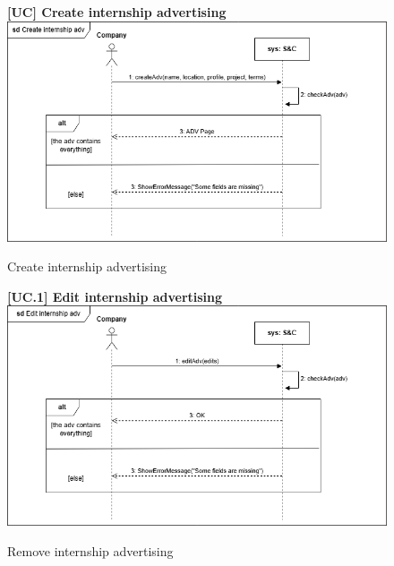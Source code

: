 \begin{figure}[H]
\textbf{[UC\nextUCDiagr] Create internship advertising}\newline\newline
\includegraphics[width=15cm]{Images/UC_diagram/RASD-UC8.drawio.png}
    \caption{Create internship advertising}
\end{figure}

\begin{figure}[H]
\textbf{[UC\nextUCDiagr.1] Edit internship advertising}\newline\newline
\includegraphics[width=15cm]{Images/UC_diagram/RASD-UC9.drawio.png}
    \caption{Remove internship advertising}
\end{figure}

